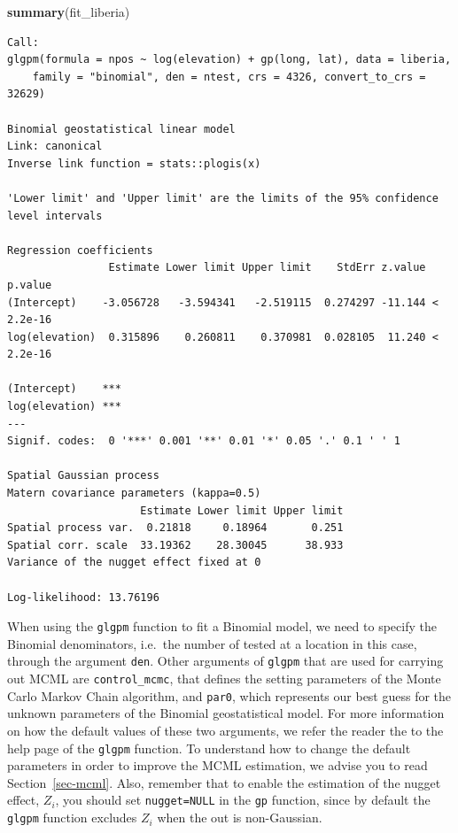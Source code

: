\documentclass[
  letterpaper,
]{krantz}
\newenvironment{Shaded}{\begin{snugshade}}{\end{snugshade}}
\newcommand{\FunctionTok}[1]{\textcolor[rgb]{0.13,0.29,0.53}{\textbf{#1}}}
\newcommand{\NormalTok}[1]{#1}
\begin{document}
\begin{Shaded}
\begin{Highlighting}[]
\FunctionTok{summary}\NormalTok{(fit\_liberia)}
\end{Highlighting}
\end{Shaded}

\begin{verbatim}
Call:
glgpm(formula = npos ~ log(elevation) + gp(long, lat), data = liberia, 
    family = "binomial", den = ntest, crs = 4326, convert_to_crs = 32629)

Binomial geostatistical linear model
Link: canonical 
Inverse link function = stats::plogis(x) 
 
'Lower limit' and 'Upper limit' are the limits of the 95% confidence level intervals

Regression coefficients
                Estimate Lower limit Upper limit    StdErr z.value   p.value
(Intercept)    -3.056728   -3.594341   -2.519115  0.274297 -11.144 < 2.2e-16
log(elevation)  0.315896    0.260811    0.370981  0.028105  11.240 < 2.2e-16
                  
(Intercept)    ***
log(elevation) ***
---
Signif. codes:  0 '***' 0.001 '**' 0.01 '*' 0.05 '.' 0.1 ' ' 1

Spatial Gaussian process
Matern covariance parameters (kappa=0.5)
                     Estimate Lower limit Upper limit
Spatial process var.  0.21818     0.18964       0.251
Spatial corr. scale  33.19362    28.30045      38.933
Variance of the nugget effect fixed at 0

Log-likelihood: 13.76196
\end{verbatim}

When using the \texttt{glgpm} function to fit a Binomial model, we need
to specify the Binomial denominators, i.e.~the number of tested at a
location in this case, through the argument \texttt{den}. Other
arguments of \texttt{glgpm} that are used for carrying out MCML are
\texttt{control\_mcmc}, that defines the setting parameters of the Monte
Carlo Markov Chain algorithm, and \texttt{par0}, which represents our
best guess for the unknown parameters of the Binomial geostatistical
model. For more information on how the default values of these two
arguments, we refer the reader the to the help page of the
\texttt{glgpm} function. To understand how to change the default
parameters in order to improve the MCML estimation, we advise you to
read Section~\ref{sec-mcml}. Also, remember that to enable the
estimation of the nugget effect, \(Z_i\), you should set
\texttt{nugget=NULL} in the \texttt{gp} function, since by default the
\texttt{glgpm} function excludes \(Z_i\) when the out is non-Gaussian.
\end{document}
